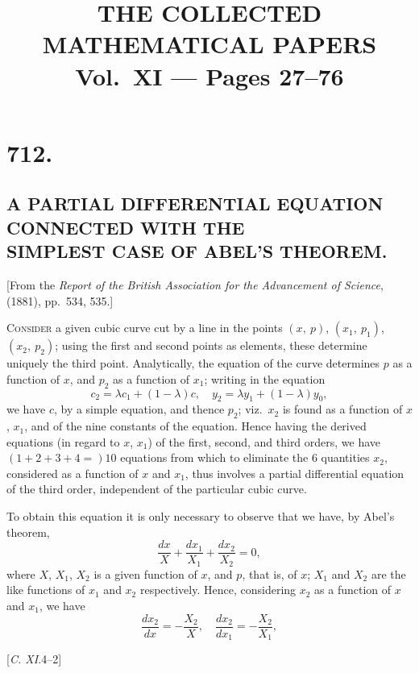 \documentclass[12pt,a4paper,oneside]{book}
\title{\vspace{-2em}THE COLLECTED MATHEMATICAL PAPERS\\Vol.~XI --- Pages 27--76}
\author{}
\date{}
\newcommand{\paperref}[1]{\par\noindent\hfill[#1]\hfill\null\par}
\theoremstyle{plain}
\theoremstyle{definition}
\theoremstyle{remark}
\begin{document}
\setcounter{page}{27}

\section*{712.}
\subsection*{A PARTIAL DIFFERENTIAL EQUATION CONNECTED WITH THE\\ SIMPLEST CASE OF ABEL'S THEOREM.}

\begin{center}
\small [From the \textit{Report of the British Association for the Advancement of Science}, (1881), pp.~534, 535.]
\end{center}

\medskip

\textsc{Consider} a given cubic curve cut by a line in the points $(x,\ p)$, $(x_1,\ p_1)$, $(x_2,\ p_2)$; using the first and second points as elements, these determine uniquely the third point. Analytically, the equation of the curve determines $p$ as a function of $x$, and $p_2$ as a function of $x_1$; writing in the equation
\[
c_2=\lambda c_1+(1-\lambda)c,\quad y_2=\lambda y_1+(1-\lambda)y_0,
\]
we have $c$, by a simple equation, and thence $p_2$; viz.\ $x_2$ is found as a function of $x$, $x_1$, and of the nine constants of the equation. Hence having the derived equations (in regard to $x$, $x_1$) of the first, second, and third orders, we have $(1+2+3+4=)10$ equations from which to eliminate the 6 quantities $x_2$, considered as a function of $x$ and $x_1$, thus involves a partial differential equation of the third order, independent of the particular cubic curve.

To obtain this equation it is only necessary to observe that we have, by Abel's theorem,
\[
\frac{dx}{X}+\frac{dx_1}{X_1}+\frac{dx_2}{X_2}=0,
\]
where $X$, $X_1$, $X_2$ is a given function of $x$, and $p$, that is, of $x$; $X_1$ and $X_2$ are the like functions of $x_1$ and $x_2$ respectively. Hence, considering $x_2$ as a function of $x$ and $x_1$, we have
\[
\frac{dx_2}{dx}=-\frac{X_2}{X},\quad \frac{dx_2}{dx_1}=-\frac{X_2}{X_1},
\]

\paperref{\textit{C. XI.}\hfill 4--2}
\end{document}
